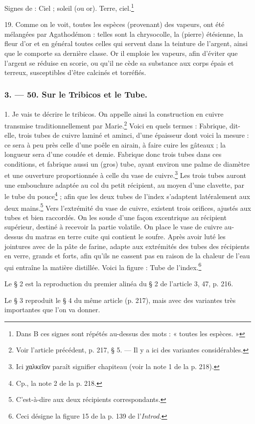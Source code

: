 \documentclass[landscape, a4paper, 11pt, oneside, polutonikogreek, french]{article}
\begin{document}
Signes de : Ciel ; soleil (ou or). Terre, ciel.\footnote{Dans B ces signes sont répétés au-dessus des mots : « toutes les espèces. »}

19. Comme on le voit, toutes les espèces (provenant) des vapeurs, ont été mélangées par Agathodémon : telles sont la chrysocolle, la (pierre) étésienne, la fleur d'or et en général toutes celles qui servent dans la teinture de l'argent, ainsi que le comporte sa dernière classe. Or il emploie les vapeurs, afin d'éviter que l'argent se réduise en scorie, ou qu'il ne cède sa substance aux corps épais et terreux, susceptibles d'être calcinés et torréfiés.

\bigskip
\centerline{\EightStarTaper}
\centerline{\EightStarTaper\EightStarTaper}
\bigskip

\subsubsection{3. --- 50. Sur le Tribicos et le Tube.}
\paragraph{}
1. Je vais te décrire le tribicos. On appelle ainsi la construction en cuivre transmise traditionnellement par Marie.\footnote{Voir l'article précédent, p. 217, § 5. --- Il y a ici des variantes considérables.} Voici en quels termes : Fabrique, dit-elle, trois tubes de cuivre laminé et aminci, d'une épaisseur dont voici la mesure : ce sera à peu près celle d'une poêle en airain, à faire cuire les gâteaux ; la longueur sera d'une coudée et demie. Fabrique donc trois tubes dans ces conditions, et fabrique aussi un (gros) tube, ayant environ une palme de diamètre et une ouverture proportionnée à celle du vase de cuivre.\footnote{Ici χαλκεῖον paraît signifier chapiteau (voir la note 1 de la p. 218).} Les trois tubes auront une embouchure adaptée au col du petit récipient, au moyen d'une clavette, par le tube du pouce\footnote{Cp., la note 2 de la p. 218.} ; afin que les deux tubes de l'index s'adaptent latéralement aux deux mains.\footnote{C'est-à-dire aux deux récipients correspondants.} Vers l'extrémité du vase de cuivre, existent trois orifices, ajustés aux tubes et bien raccordés. On les soude d'une façon excentrique au récipient supérieur, destiné à recevoir la partie volatile. On place le vase de cuivre au-dessus du matras en terre cuite qui contient le soufre. Après avoir luté les jointures avec de la pâte de farine, adapte aux extrémités des tubes des récipients en verre, grands et forts, afin qu'ils ne cassent pas en raison de la chaleur de l'eau qui entraîne la matière distillée. Voici la figure : Tube de l'index.\footnote{Ceci désigne la figure 15 de la p. 139 de l'\emph{Introd.}}
\begin{center}
Le § 2 est la reproduction du premier alinéa du § 2 de l'article 3, 47, p. 216.

Le § 3 reproduit le § 4 du même article (p. 217), mais avec des variantes très importantes que l'on va donner.
\end{center}
\end{document}
